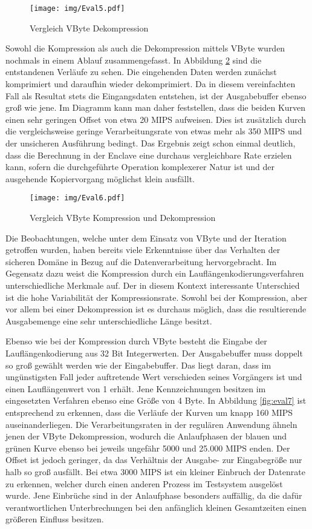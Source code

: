 \begin{figure}[h]
	\texttt{[image: img/Eval5.pdf]}
	\centering
	\caption{Vergleich VByte Dekompression}
	\label{fig:eval5}
\end{figure}

Sowohl die Kompression als auch die Dekompression mittels VByte wurden nochmals in einem Ablauf zusammengefasst. In Abbildung \ref{fig:eval6} sind die entstandenen Verläufe zu sehen. Die eingehenden Daten werden zunächst komprimiert und daraufhin wieder dekomprimiert. Da in diesem vereinfachten Fall als Resultat stets die Eingangsdaten entstehen, ist der Ausgabebuffer ebenso groß wie jene. Im Diagramm kann man daher feststellen, dass die beiden Kurven einen sehr geringen Offset von etwa 20 \ac{MIPS} aufweisen. Dies ist zusätzlich durch die vergleichsweise geringe Verarbeitungsrate von etwas mehr als 350 \ac{MIPS} und der unsicheren Ausführung bedingt. Das Ergebnis zeigt schon einmal deutlich, dass die Berechnung in der Enclave eine durchaus vergleichbare Rate erzielen kann, sofern die durchgeführte Operation komplexerer Natur ist und der ausgehende Kopiervorgang möglichst klein ausfällt.

\begin{figure}[h]
	\texttt{[image: img/Eval6.pdf]}
	\centering
	\caption{Vergleich VByte Kompression und Dekompression}
	\label{fig:eval6}
\end{figure}

Die Beobachtungen, welche unter dem Einsatz von VByte und der Iteration getroffen wurden, haben bereits viele Erkenntnisse über das Verhalten der sicheren Domäne in Bezug auf die Datenverarbeitung hervorgebracht. Im Gegensatz dazu weist die Kompression durch ein Lauflängenkodierungsverfahren unterschiedliche Merkmale auf. Der in diesem Kontext interessante Unterschied ist die hohe Variabilität der Kompressionsrate. Sowohl bei der Kompression, aber vor allem bei einer Dekompression ist es durchaus möglich, dass die resultierende Ausgabemenge eine sehr unterschiedliche Länge besitzt.

Ebenso wie bei der Kompression durch VByte besteht die Eingabe der Lauflängenkodierung aus 32 Bit Integerwerten. Der Ausgabebuffer muss doppelt so groß gewählt werden wie der Eingabebuffer. Das liegt daran, dass im ungünstigsten Fall jeder auftretende Wert verschieden seines Vorgängers ist und einen Lauflängenwert von 1 erhält. Jene Kennzeichnungen besitzen im eingesetzten Verfahren ebenso eine Größe von 4 Byte. In Abbildung \ref{fig:eval7} ist entsprechend zu erkennen, dass die Verläufe der Kurven um knapp 160 \ac{MIPS} auseinanderliegen. Die Verarbeitungsraten in der regulären Anwendung ähneln jenen der VByte Dekompression, wodurch die Anlaufphasen der blauen und grünen Kurve ebenso bei jeweils ungefähr 5000 und 25.000 \ac{MIPS} enden. Der Offset ist jedoch geringer, da das Verhältnis der Ausgabe- zur Eingabegröße nur halb so groß ausfällt. Bei etwa 3000 \ac{MIPS} ist ein kleiner Einbruch der Datenrate zu erkennen, welcher durch einen anderen Prozess im Testsystem ausgelöst wurde. Jene Einbrüche sind in der Anlaufphase besonders auffällig, da die dafür verantwortlichen Unterbrechungen bei den anfänglich kleinen Gesamtzeiten einen größeren Einfluss besitzen.

